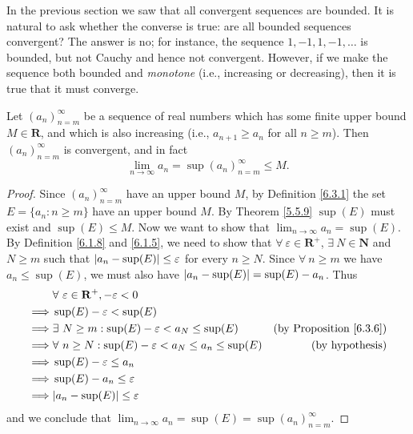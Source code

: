\begin{note}
    In the previous section we saw that all convergent sequences are bounded.
    It is natural to ask whether the converse is true:
    are all bounded sequences convergent?
    The answer is no;
    for instance, the sequence \(1, -1, 1, -1, \dots\) is bounded, but not Cauchy and hence not convergent.
    However, if we make the sequence both bounded and \emph{monotone} (i.e., increasing or decreasing), then it is true that it must converge.
\end{note}

\begin{proposition}\label{6.3.8}
    Let \((a_n)_{n = m}^\infty\) be a sequence of real numbers which has some finite upper bound \(M \in \mathbf{R}\), and which is also increasing (i.e., \(a_{n + 1} \geq a_n\) for all \(n \geq m\)).
    Then \((a_n)_{n = m}^\infty\) is convergent, and in fact
    \[
        \lim_{n \to \infty} a_n = \sup(a_n)_{n = m}^\infty \leq M.
    \]
\end{proposition}

\begin{proof}
    Since \((a_n)_{n = m}^\infty\) have an upper bound \(M\), by Definition \ref{6.3.1} the set \(E = \{a_n : n \geq m\}\) have an upper bound \(M\).
    By Theorem \ref{5.5.9} \(\sup(E)\) must exist and \(\sup(E) \leq M\).
    Now we want to show that \(\lim_{n \to \infty} a_n = \sup(E)\).
    By Definition \ref{6.1.8} and \ref{6.1.5}, we need to show that \(\forall\ \varepsilon \in \mathbf{R}^+\), \(\exists\ N \in \mathbf{N}\) and \(N \geq m\) such that \(\abs*{a_n - \sup(E)} \leq \varepsilon\) for every \(n \geq N\).
    Since \(\forall\ n \geq m\) we have \(a_n \leq \sup(E)\), we must also have \(\abs*{a_n - \sup(E)} = \sup(E) - a_n\).
    Thus
    \begin{align*}
                 & \forall\ \varepsilon \in \mathbf{R}^+, -\varepsilon < 0                                                     \\
        \implies & \sup(E) - \varepsilon < \sup(E)                                                                             \\
        \implies & \exists\ N \geq m : \sup(E) - \varepsilon < a_N \leq \sup(E)          & \text{(by Proposition \ref{6.3.6})} \\
        \implies & \forall\ n \geq N : \sup(E) - \varepsilon < a_N \leq a_n \leq \sup(E) & \text{(by hypothesis)}              \\
        \implies & \sup(E) - \varepsilon \leq a_n                                                                              \\
        \implies & \sup(E) - a_n \leq \varepsilon                                                                              \\
        \implies & \abs*{a_n - \sup(E)} \leq \varepsilon
    \end{align*}
    and we conclude that \(\lim_{n \to \infty} a_n = \sup(E) = \sup(a_n)_{n = m}^\infty\).
\end{proof}

